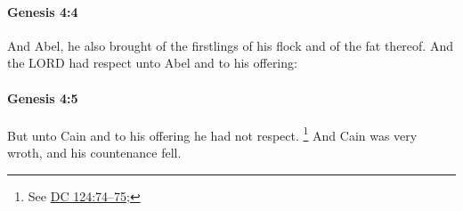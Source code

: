 		\paragraph{Genesis 4:4} %
			\label{GENESIS-4-4}

			And Abel, he also brought of the firstlings of his flock and of the fat thereof. And the LORD had respect unto Abel and to his offering:


		\paragraph{Genesis 4:5} %
			\label{GENESIS-4-5}

			But unto Cain and to his offering he had not respect.%
				\footnote{%
					See \hyperref[DC124-74]{DC 124:74--75}; 
					}
			And Cain was very wroth, and his countenance fell.


